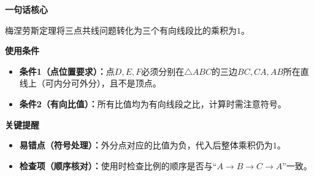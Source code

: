 \begin{summarybox}
	\textbf{\textcolor{CSummary}{一句话核心}}

	梅涅劳斯定理将三点共线问题转化为三个有向线段比的乘积为$1$。

	\medskip
	\textbf{\textcolor{CSummary}{使用条件}}
	\begin{itemize}[leftmargin=*, itemsep=0.5em, topsep=0.4em]
		\item \textbf{条件1（点位置要求）：}点$D,E,F$必须分别在$\triangle ABC$的三边$BC,CA,AB$所在直线上（可内分可外分），且不是顶点。
		\item \textbf{条件2（有向比值）：}所有比值均为有向线段之比，计算时需注意符号。
	\end{itemize}

	\medskip
	\textbf{\textcolor{CSummary}{关键提醒}}
	\begin{itemize}[leftmargin=*, itemsep=0.5em, topsep=0.4em]
		\item \textbf{易错点（符号处理）：}外分点对应的比值为负，代入后整体乘积仍为$1$。
		\item \textbf{检查项（顺序核对）：}使用时检查比例的顺序是否与“$A\to B\to C\to A$”一致。
	\end{itemize}
\end{summarybox}
